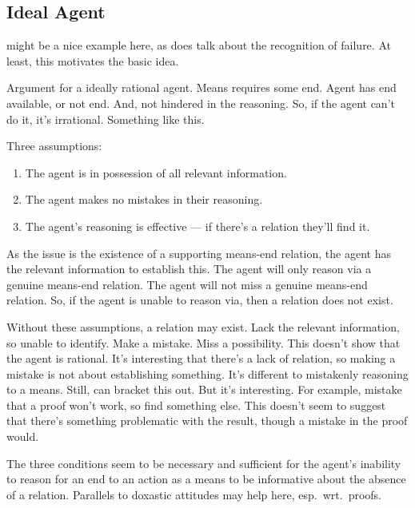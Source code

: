 \documentclass[10pt]{article}
\begin{document}
\subsection{Ideal Agent}
\label{sec:ideal-agent}

\begin{note}
  \citeauthor{Hume:2011aa} might be a nice example here, as \citeauthor{Hume:2011aa} does talk about the recognition of failure.
  At least, this motivates the basic idea.
\end{note}

Argument for a ideally rational agent.
Means requires some end.
Agent has end available, or not end.
And, not hindered in the reasoning.
So, if the agent can't do it, it's irrational.
Something like this.

Three assumptions:
\begin{enumerate}
\item The agent is in possession of all relevant information.
\item The agent makes no mistakes in their reasoning.
\item The agent's reasoning is effective --- if there's a relation they'll find it.
\end{enumerate}

As the issue is the existence of a supporting means-end relation, the agent has the relevant information to establish this.
The agent will only reason via a genuine means-end relation.
The agent will not miss a genuine means-end relation.
So, if the agent is unable to reason via, then a relation does not exist.

Without these assumptions, a relation may exist.
Lack the relevant information, so unable to identify.
Make a mistake.
Miss a possibility.
This doesn't show that the agent is rational.
It's interesting that there's a lack of relation, so making a mistake is not about establishing something.
It's different to mistakenly reasoning to a means.
Still, can bracket this out.
But it's interesting.
For example, mistake that a proof won't work, so find something else.
This doesn't seem to suggest that there's something problematic with the result, though a mistake in the proof would.

\begin{note}
  The three conditions seem to be necessary and sufficient for the agent's inability to reason for an end to an action as a means to be informative about the absence of a relation.
  Parallels to doxastic attitudes may help here, esp.\ wrt.\ proofs.
\end{note}
\end{document}
